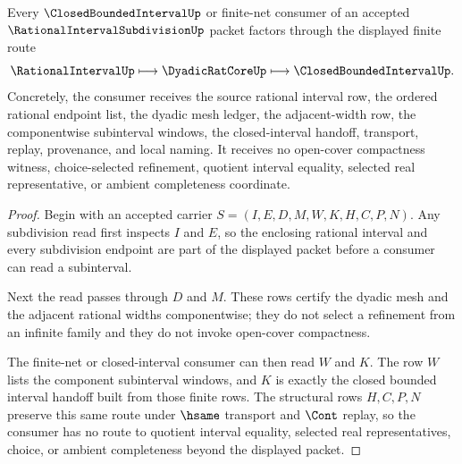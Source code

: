 \begin{theorem}
\label{thm:rational-interval-subdivision-closed-interval-handoff}
Every $\ClosedBoundedIntervalUp$ or finite-net consumer of an accepted $\RationalIntervalSubdivisionUp$ packet factors through the displayed finite route
$$
\RationalIntervalUp \longmapsto \DyadicRatCoreUp \longmapsto \ClosedBoundedIntervalUp .
$$
Concretely, the consumer receives the source rational interval row, the ordered rational endpoint list, the dyadic mesh ledger, the adjacent-width row, the componentwise subinterval windows, the closed-interval handoff, transport, replay, provenance, and local naming. It receives no open-cover compactness witness, choice-selected refinement, quotient interval equality, selected real representative, or ambient completeness coordinate.
\end{theorem}
\begin{proof}
Begin with an accepted carrier $S=(I,E,D,M,W,K,H,C,P,N)$. Any subdivision read first inspects $I$ and $E$, so the enclosing rational interval and every subdivision endpoint are part of the displayed packet before a consumer can read a subinterval.

Next the read passes through $D$ and $M$. These rows certify the dyadic mesh and the adjacent rational widths componentwise; they do not select a refinement from an infinite family and they do not invoke open-cover compactness.

The finite-net or closed-interval consumer can then read $W$ and $K$. The row $W$ lists the component subinterval windows, and $K$ is exactly the closed bounded interval handoff built from those finite rows. The structural rows $H,C,P,N$ preserve this same route under $\hsame$ transport and $\Cont$ replay, so the consumer has no route to quotient interval equality, selected real representatives, choice, or ambient completeness beyond the displayed packet.
\end{proof}




